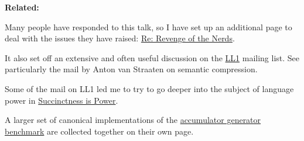 \textbf{Related:}

Many people have responded to this talk, so I have set up an additional
page to deal with the issues they have raised: \href{icadmore.html}{Re:
Revenge of the Nerds}.

It also set off an extensive and often useful discussion on the
\href{http://www.ai.mit.edu/~gregs/ll1-discuss-archive-html/threads.html}{LL1}
mailing list. See particularly the mail by Anton van Straaten on
semantic compression.

Some of the mail on LL1 led me to try to go deeper into the subject of
language power in \href{power.html}{Succinctness is Power}.

A larger set of canonical implementations of the
\href{accgen.html}{accumulator generator benchmark} are collected
together on their own page.
